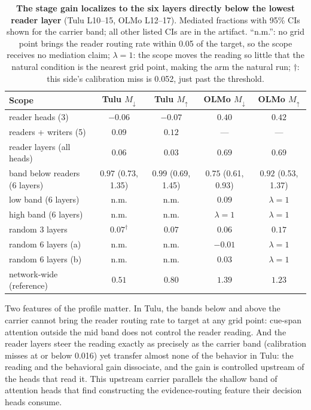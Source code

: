 \documentclass{article}
\begin{document}
\begin{table}[h]
\centering
\small
\setlength{\tabcolsep}{4pt}
\begin{tabular}{lcccc}
\toprule
Scope & Tulu $M_\downarrow$ & Tulu $M_\uparrow$ & OLMo $M_\downarrow$ & OLMo $M_\uparrow$ \\
\midrule
reader heads (3) & $-0.06$ & $-0.07$ & $0.40$ & $0.42$ \\
readers + writers (5) & $0.09$ & $0.12$ & --- & --- \\
reader layers (all heads) & $0.06$ & $0.03$ & $0.69$ & $0.69$ \\
band below readers (6 layers) & $\mathbf{0.97}$ {\scriptsize(0.73, 1.35)} & $\mathbf{0.99}$ {\scriptsize(0.69, 1.45)} & $\mathbf{0.75}$ {\scriptsize(0.61, 0.93)} & $\mathbf{0.92}$ {\scriptsize(0.53, 1.37)} \\
low band (6 layers) & n.m. & n.m. & $0.09$ & $\lambda{=}1$ \\
high band (6 layers) & n.m. & n.m. & $\lambda{=}1$ & $\lambda{=}1$ \\
random 3 layers & $0.07^{\dagger}$ & $0.07$ & $0.06$ & $0.17$ \\
random 6 layers (a) & n.m. & n.m. & $-0.01$ & $\lambda{=}1$ \\
random 6 layers (b) & n.m. & n.m. & $0.03$ & $\lambda{=}1$ \\
\midrule
network-wide (reference) & $0.51$ & $0.80$ & $1.39$ & $1.23$ \\
\bottomrule
\end{tabular}
\caption{\textbf{The stage gain localizes to the six layers directly below the lowest reader layer} (Tulu L10--15, OLMo L12--17). Mediated fractions with 95\% CIs shown for the carrier band; all other listed CIs are in the artifact. ``n.m.'': no grid point brings the reader routing rate within 0.05 of the target, so the scope receives no mediation claim; $\lambda{=}1$: the scope moves the reading so little that the natural condition is the nearest grid point, making the arm the natural run; $\dagger$: this side's calibration miss is 0.052, just past the threshold.}
\label{tab:gainlocal}
\end{table}

Two features of the profile matter. In Tulu, the bands below and above the carrier cannot bring the reader routing rate to target at any grid point: cue-span attention outside the mid band does not control the reader reading. And the reader layers steer the reading exactly as precisely as the carrier band (calibration misses at or below 0.016) yet transfer almost none of the behavior in Tulu: the reading and the behavioral gain dissociate, and the gain is controlled upstream of the heads that read it. This upstream carrier parallels the shallow band of attention heads that \citet{sun2026persuaded} find constructing the evidence-routing feature their decision heads consume.
\end{document}
